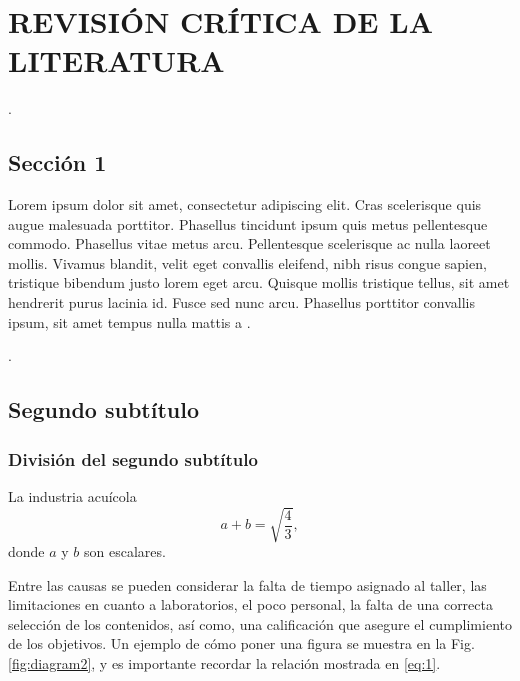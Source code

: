 \chapter{REVISIÓN CRÍTICA DE LA LITERATURA}

.

\section{Sección 1}

Lorem ipsum dolor sit amet, consectetur adipiscing elit. Cras scelerisque quis augue malesuada porttitor. Phasellus tincidunt ipsum quis metus pellentesque commodo. Phasellus vitae metus arcu. Pellentesque scelerisque ac nulla laoreet mollis. Vivamus blandit, velit eget convallis eleifend, nibh risus congue sapien, tristique bibendum justo lorem eget arcu. Quisque mollis tristique tellus, sit amet hendrerit purus lacinia id. Fusce sed nunc arcu. Phasellus porttitor convallis ipsum, sit amet tempus nulla mattis a \cite{Reumann2012}.

.

\section{Segundo subtítulo}

\subsection{División del segundo subtítulo}

La industria acuícola 
%
\begin{equation}
  \label{eq:1}
  a+b=\sqrt{\frac{4}{3}},
\end{equation}
%
donde $a$ y $b$ son escalares.

Entre las causas se pueden considerar la falta de tiempo asignado al taller,
las limitaciones en cuanto a laboratorios, el poco personal, la falta de una
correcta selección de los contenidos, así como, una calificación que asegure el
cumplimiento de los objetivos. Un ejemplo de cómo poner una figura se muestra en la Fig. \ref{fig:diagram2}, y es importante recordar la relación mostrada en \eqref{eq:1}.


